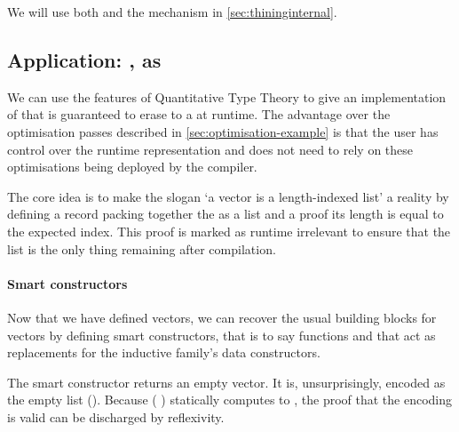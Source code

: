 \noindent
\begin{minipage}[t]{0.55\textwidth}
\end{minipage}\hfill
\begin{minipage}[t]{0.4\textwidth}
\end{minipage}

We will use both  and the  mechanism in
\cref{sec:thininginternal}.

\subsection{Application: , as }

We can use the features of Quantitative Type Theory to give an implementation
of  that is guaranteed to erase to a  at runtime.
%
The advantage over the optimisation passes described in \cref{sec:optimisation-example}
is that the user has control over the runtime representation and does not need to
rely on these optimisations being deployed by the compiler.

The core idea is to make the slogan `a vector is a length-indexed list' a reality
by defining a record packing together the  as a list and
a proof its length is equal to the expected  index.
%
This proof is marked as runtime irrelevant to ensure that the list is the only
thing remaining after compilation.


\paragraph{Smart constructors}
Now that we have defined vectors,
we can recover the usual building blocks for vectors by defining smart
constructors, that is to say functions  and
\IdrisFunction{(::)} that act as replacements for the inductive
family's data constructors.


The smart constructor  returns an empty vector.
It is, unsurprisingly, encoded as the empty list (\IdrisData{[]}).
%
Because ( \IdrisData{[]}) statically computes to
, the proof that the encoding is valid can be discharged by
reflexivity.

